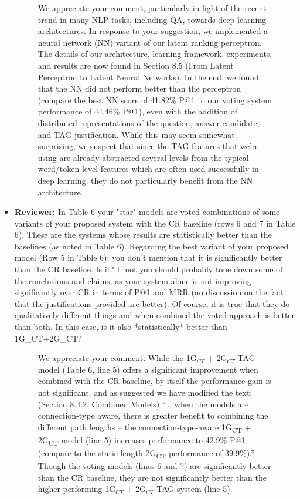 \documentclass[10pt]{article}
\begin{document}
\begin{itemize}
\begin{figure}[H]
\caption{We appreciate your comment, particularly in light of the recent trend in many NLP tasks, including QA, towards deep learning architectures.  In response to your suggestion, we implemented a neural network (NN) variant of our latent ranking perceptron.  The details of our architecture, learning framework, experiments, and results are now found in Section 8.5 (From Latent Perceptron to Latent Neural Networks).  In the end, we found that the NN did not perform better than the perceptron (compare the best NN score of 41.82\% P@1 to our voting system performance of 44.46\% P@1), even with the addition of distributed representations of the question, answer candidate, and TAG justification.  While this may seem somewhat surprising, we suspect that since the TAG features that we're using are already abstracted several levels from the typical word/token level features which are often used successfully in deep learning, they do not particularly benefit from the NN architecture.}
\label{resp:nn}
\end{figure}


\item \textbf{Reviewer:} In Table 6 your "star" models are voted combinations of some variants of
your proposed system with the CR baseline (rows 6 and 7 in Table 6). These
are the systems whose results are statistically better than the baselines
(as noted in Table 6). Regarding the best variant of your proposed model
(Row 5 in Table 6): you don't mention that it is significantly better than
the CR baseline. Is it? If not you should probably tone down some of the
conclusions and claims, as your system alone is not improving significantly
over CR in terms of P@1 and MRR (no discussion on the fact that the
justifications provided are better). Of course, it is true that they do
qualitatively different things and when combined the voted approach is
better than both. In this case, is it also *statistically* better than
1G\_CT+2G\_CT?

\begin{figure}[H]
\caption{We appreciate your comment.  While the 1G$_{CT}$ + 2G$_{CT}$ TAG model (Table 6, line 5)
offers a significant improvement when combined with the CR baseline, by itself
the performance gain is not significant, and as suggested we have modified the text:
(Section 8.4.2, Combined Models) ``... when the models are connection-type aware, there is greater benefit to combining the different path lengths -- the connection-type-aware 1G\textsubscript{CT} + 2G\textsubscript{CT} model (line 5) increases performance to 42.9\% P@1 (compare to the static-length 2G\textsubscript{CT} performance of 39.9\%).''
Though the voting models (lines 6 and 7) are significantly better than the CR baseline, 
they are not significantly better than the higher performing 1G$_{CT}$ + 2G$_{CT}$ TAG system (line 5).}
\end{figure}  



\end{itemize}
\end{document}
